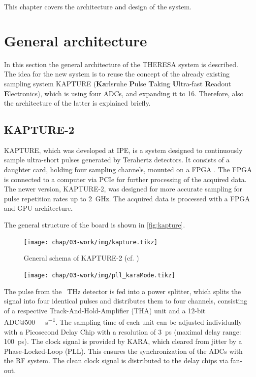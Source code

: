 This chapter covers the architecture and design of the system.
\section{General architecture}
In this section the general architecture of the THERESA system is described.
The idea for the new system is to reuse the concept of the already existing sampling system KAPTURE (\textbf{Ka}rlsruhe \textbf{P}ulse \textbf{T}aking \textbf{U}ltra-fast \textbf{R}eadout \textbf{E}lectronics), which is using four ADCs, and expanding it to 16. Therefore, also the architecture of the latter is explained briefly.
\subsection{KAPTURE-2}
KAPTURE, which was developed at IPE, is a system designed to continuously sample ultra-short pulses generated by Terahertz detectors. It consists of a daughter card, holding four sampling channels, mounted on a FPGA . The FPGA is connected to a computer via PCIe for further processing of the acquired data. \cite{brosi} 
The newer version, KAPTURE-2, was designed for more accurate sampling for pulse repetition rates up to \SI{2}{\giga \hertz}. The acquired data is processed with a FPGA and GPU architecture.  \cite{caselleKAP}

The general structure of the board is shown in \autoref{fig:kapture}.

\begin{figure}[H]
	\centering
	\texttt{[image: chap/03-work/img/kapture.tikz]}
	\caption{General schema of KAPTURE-2 (cf. \cite[p.2]{caselleKAP})}
	\label{fig:kapture}
\end{figure}

\begin{figure}[H]
	\centering
	\texttt{[image: chap/03-work/img/pll\_karaMode.tikz]}
	\caption{}
	\label{fig:pll}
\end{figure}

The pulse from the \SI{}{\tera \hertz} detector is fed into a power splitter, which splits the signal into four identical pulses and distributes them to four channels, consisting of a respective Track-And-Hold-Amplifier (THA) unit and a 12-bit ADC@\SI{500}{\mega\sample\per\second}. The sampling time of each unit can be adjusted individually with a Picosecond Delay Chip with a resolution of \SI{3}{\pico \second} (maximal delay range: \SI{100}{\pico \second}). 
The clock signal is provided by KARA, which cleared from jitter by a Phase-Locked-Loop (PLL). This ensures the synchronization of the ADCs with the RF system. The clean clock signal is distributed to the delay chips via fan-out. \cite{caselleKAP}

